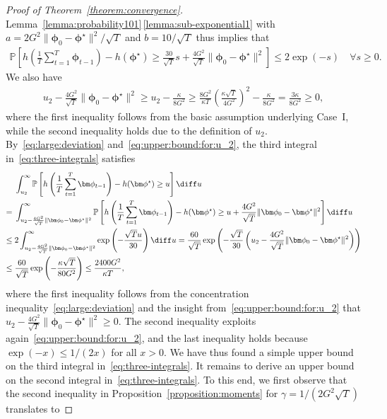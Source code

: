 \documentclass[11pt, a4paper, oneside, reqno]{article}
\begin{document}
\begin{proof} [Proof of Theorem~\ref{theorem:convergence}]
\[		\]
		Lemma~\ref{lemma:probability101}\,\ref{lemma:sub-exponential1} with $a = 2 G^2 \| \bm \phi_0 -\bm \phi^\star \|^2 / \sqrt{T}$ and $b = 10 / \sqrt{T}$ thus implies that
		\begin{align}
		    \label{eq:large:deviation}
		    \mathbb P \left[ h \left(\frac{1}{T} \sum_{t=1}^{T} \bm \phi_{t-1} \right) - h(\bm \phi^\star) \geq \frac{30}{\sqrt{T}} s + \frac{4 G^2}{\sqrt{T}} \| \bm \phi_0 - \bm \phi^\star \|^2 \right] \leq 2 \exp(-s) \quad \forall s \geq 0.
		\end{align}
		We also have
		\begin{align}
		    \label{eq:upper:bound:for:u_2}
		    u_2 - \frac{4 G^2}{\sqrt{T}} \| \bm \phi_0 - \bm \phi^\star \|^2 
		    \geq u_2 - \frac{\kappa}{8 G^2} \geq \frac{8 G^2}{\kappa T} \left( \frac{\kappa \sqrt{T}}{4 G^2} \right)^2 - \frac{\kappa}{8 G^2} = \frac{3 \kappa}{8 G^2} \geq 0,
		\end{align}
		where the first inequality follows from the basic assumption underlying Case~I, while the second inequality holds due to the definition of $u_2$. 
		By~\eqref{eq:large:deviation} and~\eqref{eq:upper:bound:for:u_2}, the third integral in~\eqref{eq:three-integrals} satisfies
		\begin{align*}
		    &\int_{u_2}^{\infty} \mathbb P \left[ h \left(\frac{1}{T} \sum_{t=1}^{T} \bm \phi_{t-1} \right) - h(\bm \phi^\star) \geq u \right] \diff u \\
		    =\;& \int_{u_2 - \frac{4 G^2}{\sqrt{T}} \| \bm \phi_0 - \bm \phi^\star \|^2}^{\infty} \mathbb P \left[ h \left(\frac{1}{T} \sum_{t=1}^{T} \bm \phi_{t-1} \right) - h(\bm \phi^\star) \geq u + \frac{4 G^2}{\sqrt{T}} \| \bm \phi_0 - \bm \phi^\star \|^2 \right] \diff u \\
		    \leq\; & 2 \int_{u_2 - \frac{4 G^2}{\sqrt{T}} \| \bm \phi_0 - \bm \phi^\star \|^2}^\infty \exp \left( -\frac{\sqrt{T} u}{30} \right) \diff u= \frac{60}{\sqrt{T}} \exp \left( -\frac{\sqrt{T}}{30} \left( u_2 - \frac{4 G^2}{\sqrt{T}} \| \bm \phi_0 - \bm \phi^\star \|^2 \right) \right) \\
		    \leq\; & \frac{60}{\sqrt{T}} \exp \left( -\frac{\kappa \sqrt{T}}{80 G^2} \right) \leq \frac{2400 G^2}{\kappa T},
		\end{align*}
		where the first inequality follows from the concentration inequality~\eqref{eq:large:deviation} and the insight from~\eqref{eq:upper:bound:for:u_2} that $u_2 - \frac{4 G^2}{\sqrt{T}}\| \bm \phi_0 - \bm \phi^\star \|^2 \geq 0$. The second inequality exploits again~\eqref{eq:upper:bound:for:u_2}, and the last inequality holds because $\exp(-x) \leq 1 / (2x)$ for all $ x > 0$. We have thus found a simple upper bound on the third integral in~\eqref{eq:three-integrals}. It remains to derive an upper bound on the second integral in~\eqref{eq:three-integrals}. To this end, we first observe that the second inequality in Proposition~\ref{proposition:moments} for $\gamma = 1 / (2 G^2 \sqrt{T})$ translates to

\end{proof}
\end{document}
